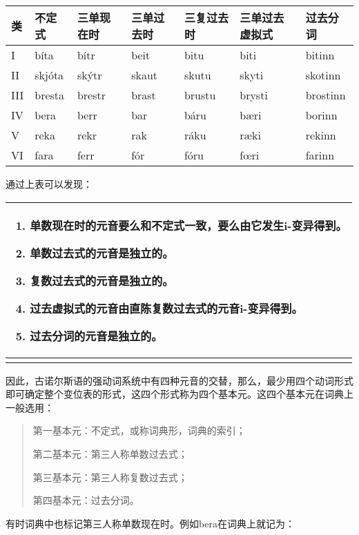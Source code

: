 \begin{longtable}{lllllll}
  \toprule
  类  & 不定式 & 三单现在时 & 三单过去时 & 三复过去时 & 三单过去虚拟式 & 过去分词 \\
  \midrule
  \endhead
  \bottomrule
  \endfoot
  I   & bíta   & bítr       & beit       & bitu       & biti           & bitinn   \\
  II  & skjóta & skýtr      & skaut      & skutu      & skyti          & skotinn  \\
  III & bresta & brestr     & brast      & brustu     & brysti         & brostinn \\
  IV  & bera   & berr       & bar        & báru       & bæri           & borinn   \\
  V   & reka   & rekr       & rak        & ráku       & ræki           & rekinn   \\
  VI  & fara   & ferr       & fór        & fóru       & fœri           & farinn   \\
\end{longtable}

通过上表可以发现：

\begin{longtable}{l}
  \toprule
  \begin{enumerate}\def\labelenumi{\arabic{enumi})}\item  单数现在时的元音要么和不定式一致，要么由它发生i-变异得到。\item  单数过去式的元音是独立的。\item  复数过去式的元音是独立的。\item  过去虚拟式的元音由直陈复数过去式的元音i-变异得到。\item  过去分词的元音是独立的。\end{enumerate} \\
  \midrule
  \endhead
  \bottomrule
  \endfoot
\end{longtable}

因此，古诺尔斯语的强动词系统中有四种元音的交替，那么，最少用四个动词形式即可确定整个变位表的形式，这四个形式称为四个基本元。这四个基本元在词典上一般选用：

\begin{quote}
  第一基本元：不定式，或称词典形，词典的索引；

  第二基本元：第三人称单数过去式；

  第三基本元：第三人称复数过去式；

  第四基本元：过去分词。
\end{quote}

有时词典中也标记第三人称单数现在时。例如bera在词典上就记为：

